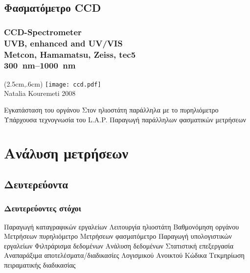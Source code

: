 \documentclass[noamsthm,12pt]{beamer}
\begin{document}
\subsection{Φασματόμετρο CCD}

\begin{frame}
	\frametitle{CCD-Spectrometer\\ \vspace{-.5\baselineskip}
	{\small UVB, enhanced and UV/VIS}\\ \vspace{-.5\baselineskip}
	{\small Metcon, Hamamatsu, Zeiss, tec5}\\
	{\small \SIrange{300}{1000}{\nano\meter}}
	}

	\begin{textblock*}{3cm}(2.5cm,.6cm) %
	\texttt{[image: ccd.pdf]}\\ \vspace{-10pt}
	{\tiny Natalia Kouremeti 2008}
	\end{textblock*}
	
	\begin{outline}
		\1 Εγκατάσταση του οργάνου
			\2[] Στον ηλιοστάτη παράλληλα με το πυρηλιόμετρο
		\1 Υπάρχουσα τεχνογνωσία του L.A.P.
		\1 Παραγωγή παράλληλων φασματικών μετρήσεων
	\end{outline}
\end{frame}




\section{Ανάλυση μετρήσεων}









\subsection{Δευτερεύοντα}


\begin{frame}
	\frametitle{Δευτερεύοντες στόχοι}
	
	\begin{outline}
		\1 Παραγωγή καταγραφικών εργαλείων
			\2[] Λειτουργία ηλιοστάτη
			\2[] Βαθμονόμηση οργάνου
			\2[] Μετρήσεων πυρηλιόμετρο
			\2[] Μετρήσεων φασματόμετρο
		\1 Παραγωγή υπολογιστικών εργαλείων
			\2[] Φιλτράρισμα δεδομένων
			\2[] Ανάλυση δεδομένων
			\2[] Στατιστική επεξεργασία
		\1 Αναπαράξιμα αποτελέσματα/διαδικασίες
			\2[] Λογισμικού Ανοικτού Κώδικα
			\2[] Τεκμηρίωση πειραματικής διαδικασίας
	\end{outline}
\end{frame}
\end{document}
